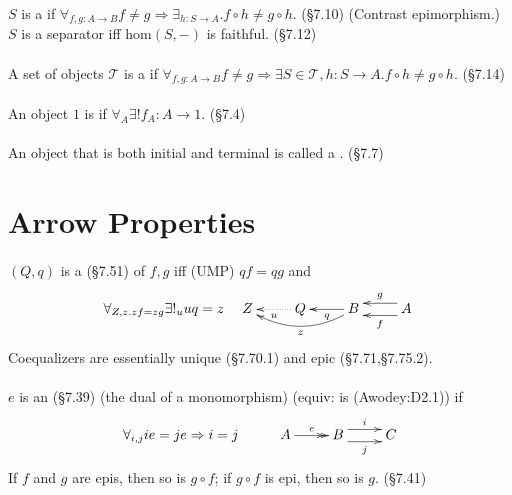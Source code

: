 \documentclass[10pt,twocolumn,letterpaper]{article}
\begin{document}
  \paragraph{}
  $S$ is a  if $\forall_{f,g : A \to B} f \ne g
  \Rightarrow \exists_{h : S \to A} . f \circ h \ne g \circ h$. (\S7.10)
  (Contrast epimorphism.)
  $S$ is a separator iff $\mbox{hom}(S,-)$ is faithful. (\S7.12)

  \paragraph{}
  A set of objects $\mathcal{T}$ is a  if
  $\forall_{f,g : A \to B} f \ne g \Rightarrow \exists{S \in \mathcal{T},
  h : S \to A} . f \circ h \ne g \circ h$. (\S7.14)

  \paragraph{}
  An object $1$ is  if $\forall_A \exists! f_A : A \to 1$.
  (\S7.4)

  \paragraph{}
  An object that is both initial and terminal is called a .
  (\S7.7)

\section{Arrow Properties} %

  \paragraph{}
  $(Q,q)$ is a  (\S7.51) of $f,g$ iff (UMP) $qf = qg$ and
     \[\forall_{Z,z . zf = zg} \exists!_u uq = z \quad
     \xymatrix{
     Z & Q \ar@{..>}[l]^u & B \ar[l]^q \ar@/^1pc/[ll]^{z} & A \ar@<1ex>[l]^f \ar@<-1ex>[l]_g
     }\]
  Coequalizers are essentially unique (\S7.70.1) and epic (\S7.71,\S7.75.2).

  \paragraph{}
  $e$ is an  (\S7.39) (the dual of a monomorphism)
  (equiv: is  (Awodey:D2.1)) if
    \[\xymatrix{\forall_{i,j} ie = je \Rightarrow i = j & A \ar@{->>}[r]^e & B \ar@<1ex>[r]^{i} \ar@<-1ex>[r]_j & C} \]
  If $f$ and $g$ are epis, then so is $g \circ f$; if $g \circ f$ is epi,
  then so is $g$. (\S7.41)
\end{document}
